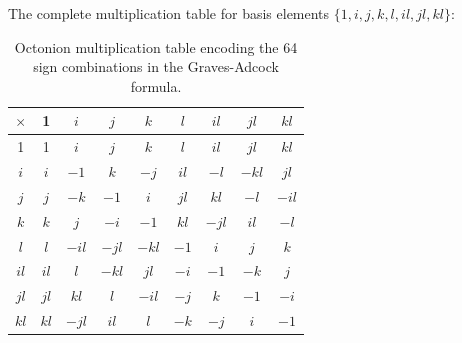 \documentclass[11pt,a4paper]{article}
\begin{document}
The complete multiplication table for basis elements $\{1, i, j, k, l, il, jl, kl\}$:

\begin{table}[h]
\centering
\small
\begin{tabular}{c|cccccccc}
$\times$ & 1 & $i$ & $j$ & $k$ & $l$ & $il$ & $jl$ & $kl$ \\
\hline
1 & 1 & $i$ & $j$ & $k$ & $l$ & $il$ & $jl$ & $kl$ \\
$i$ & $i$ & $-1$ & $k$ & $-j$ & $il$ & $-l$ & $-kl$ & $jl$ \\
$j$ & $j$ & $-k$ & $-1$ & $i$ & $jl$ & $kl$ & $-l$ & $-il$ \\
$k$ & $k$ & $j$ & $-i$ & $-1$ & $kl$ & $-jl$ & $il$ & $-l$ \\
$l$ & $l$ & $-il$ & $-jl$ & $-kl$ & $-1$ & $i$ & $j$ & $k$ \\
$il$ & $il$ & $l$ & $-kl$ & $jl$ & $-i$ & $-1$ & $-k$ & $j$ \\
$jl$ & $jl$ & $kl$ & $l$ & $-il$ & $-j$ & $k$ & $-1$ & $-i$ \\
$kl$ & $kl$ & $-jl$ & $il$ & $l$ & $-k$ & $-j$ & $i$ & $-1$ \\
\end{tabular}
\caption{Octonion multiplication table encoding the 64 sign combinations in the Graves-Adcock formula.}
\end{table}
\end{document}
